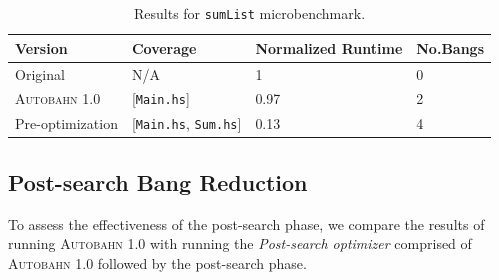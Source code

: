 \documentclass[format=sigplan, review=true]{acmart}
\newcommand{\hotspots}[0]{hot spots}
\newcommand{\Ao}[0]{\textsc{Autobahn 1.0}}
\newcommand{\preopt}[0]{pre-search}
\newcommand{\postopt}[0]{post-search}
\newcommand{\Postopt}[0]{Post-search}
\begin{document}


\begin{table}
\begin{tabular}{p{2.5cm}p{1.5cm}p{2cm}p{1cm}}
\hline
Version   & Coverage & Normalized Runtime & No.Bangs \\
\hline
Original      & N/A   &   1	 & 0   \\
\Ao{}       & [\texttt{Main.hs}]      & 0.97    &  2\\
Pre-optimization	& [\texttt{Main.hs}, \texttt{Sum.hs}]         & 0.13      & 4\\
\hline
\end{tabular}
\caption{Results for \texttt{sumList} microbenchmark.}
\label{table:sumList}
\end{table}

\subsection{\Postopt{} Bang Reduction}

To assess the effectiveness of the \postopt{} phase,
we compare the results of running \Ao{} with running 
the \textit{\Postopt{} optimizer} comprised of \Ao{} followed by
the \postopt{} phase.
\end{document}
